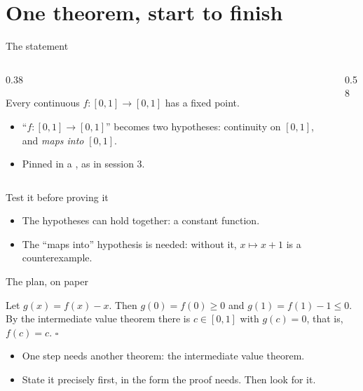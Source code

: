 \documentclass[10pt, aspectratio=169]{beamer}
\begin{document}
\section{One theorem, start to finish}

\begin{frame}[fragile]{The statement}
\begin{columns}[T]
\begin{column}{0.38\textwidth}
\begin{paper}[Theorem]
Every continuous $f : [0, 1] \to [0, 1]$ has a fixed point.
\end{paper}

\begin{itemize}
\item ``$f : [0,1] \to [0,1]$'' becomes two hypotheses: continuity on $[0,1]$, and \emph{maps into} $[0,1]$.
\item Pinned in a , as in session 3.
\end{itemize}
\end{column}
\begin{column}{0.58\textwidth}
\leanlabel
{}
\end{column}
\end{columns}
\end{frame}

\begin{frame}[fragile]{Test it before proving it\livedemo}

\vspace{0.3em}
\begin{itemize}
\item The hypotheses can hold together: a constant function.
\item The ``maps into'' hypothesis is needed: without it, $x \mapsto x + 1$ is a counterexample.
\end{itemize}
\end{frame}

\begin{frame}[fragile]{The plan, on paper}
\begin{paper}[Proof]
Let $g(x) = f(x) - x$. Then $g(0) = f(0) \ge 0$ and $g(1) = f(1) - 1 \le 0$. By the intermediate value theorem there is $c \in [0, 1]$ with $g(c) = 0$, that is, $f(c) = c$. \hfill$\square$
\end{paper}

\vspace{0.6em}
\begin{itemize}
\item One step needs another theorem: the intermediate value theorem.
\item State it precisely first, in the form the proof needs. Then look for it.
\end{itemize}
\end{frame}
\end{document}
